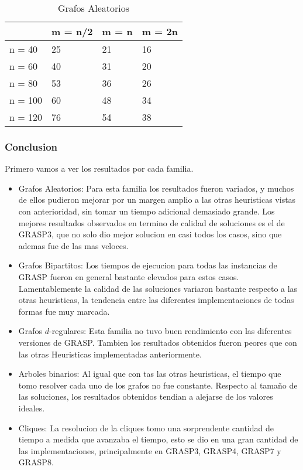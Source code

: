 \begin{table}[H]
\centering
\caption{Grafos Aleatorios}
\label{my-label}
\begin{tabular}{|l|lll|}
\hline
        & \multicolumn{1}{l|}{m = n/2} & \multicolumn{1}{l|}{m = n} & m = 2n \\ \hline
n = 40  & 25                           & 21                         & 16     \\ \cline{1-1}
n = 60  & 40                           & 31                         & 20     \\ \cline{1-1}
n = 80  & 53                           & 36                         & 26     \\ \cline{1-1}
n = 100 & 60                           & 48                         & 34     \\ \cline{1-1}
n = 120 & 76                           & 54                         & 38     \\ \hline
\end{tabular}
\end{table}


\subsubsection{Conclusion}

Primero vamos a ver los resultados por cada familia.

\begin{itemize}
	\item Grafos Aleatorios: Para esta familia los resultados fueron variados, y muchos de ellos pudieron mejorar por un margen amplio a las otras heuristicas vistas con anterioridad, sin tomar un tiempo adicional demasiado grande. Los mejores resultados observados en termino de calidad de soluciones es el de GRASP3, que no solo dio mejor solucion en casi todos los casos, sino que ademas fue de las mas veloces.	
	\item Grafos Bipartitos: Los tiempos de ejecucion para todas las instancias de GRASP fueron en general bastante elevados para estos casos. Lamentablemente la calidad de las soluciones variaron bastante respecto a las otras heuristicas, la tendencia entre las diferentes implementaciones de todas formas fue muy marcada.
	\item Grafos $d$-regulares: Esta familia no tuvo buen rendimiento con las diferentes versiones de GRASP. Tambien los resultados obtenidos fueron peores que con las otras Heuristicas implementadas anteriormente.
	\item Arboles binarios: Al igual que con tas las otras heuristicas, el tiempo que tomo resolver cada uno de los grafos no fue constante. Respecto al tamaño de las soluciones, los resultados obtenidos tendian a alejarse de los valores ideales.
	\item Cliques: La resolucion de la cliques tomo una sorprendente cantidad de tiempo a medida que avanzaba el tiempo, esto se dio en una gran cantidad de las implementaciones, principalmente en GRASP3, GRASP4, GRASP7 y GRASP8.
\end{itemize}


